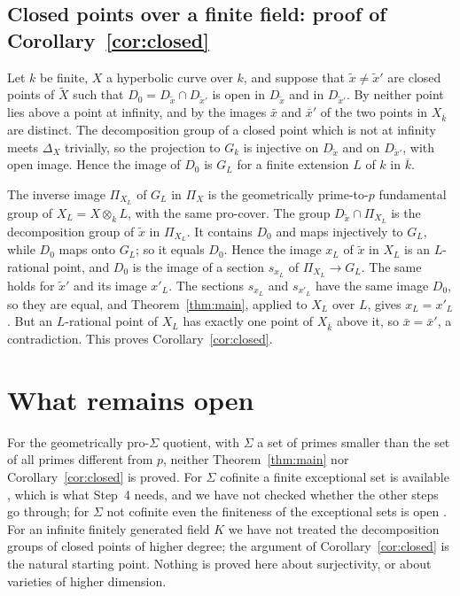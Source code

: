 \subsection{Closed points over a finite field: proof of Corollary~\ref{cor:closed}}
Let $k$ be finite, $X$ a hyperbolic curve over $k$, and suppose that $\tilde x\ne\tilde x'$ are closed points of $\widetilde X$ such that $D_0=D_{\tilde x}\cap D_{\tilde x'}$ is open in $D_{\tilde x}$ and in $D_{\tilde x'}$. By \cite[Proposition 1.8(ii)]{ST09} neither point lies above a point at infinity, and by \cite[Proposition 1.8(iii)]{ST09} the images $\bar x$ and $\bar x'$ of the two points in $X_{\overline k}$ are distinct. The decomposition group of a closed point which is not at infinity meets $\Delta_X$ trivially, so the projection to $G_k$ is injective on $D_{\tilde x}$ and on $D_{\tilde x'}$, with open image. Hence the image of $D_0$ is $G_L$ for a finite extension $L$ of $k$ in $\overline k$.

The inverse image $\Pi_{X_L}$ of $G_L$ in $\Pi_X$ is the geometrically prime-to-$p$ fundamental group of $X_L=X\otimes_kL$, with the same pro-cover. The group $D_{\tilde x}\cap\Pi_{X_L}$ is the decomposition group of $\tilde x$ in $\Pi_{X_L}$. It contains $D_0$ and maps injectively to $G_L$, while $D_0$ maps onto $G_L$; so it equals $D_0$. Hence the image $x_L$ of $\tilde x$ in $X_L$ is an $L$-rational point, and $D_0$ is the image of a section $s_{x_L}$ of $\Pi_{X_L}\to G_L$. The same holds for $\tilde x'$ and its image $x'_L$. The sections $s_{x_L}$ and $s_{x'_L}$ have the same image $D_0$, so they are equal, and Theorem~\ref{thm:main}, applied to $X_L$ over $L$, gives $x_L=x'_L$. But an $L$-rational point of $X_L$ has exactly one point of $X_{\overline k}$ above it, so $\bar x=\bar x'$, a contradiction. This proves Corollary~\ref{cor:closed}.

\section{What remains open}
For the geometrically pro-$\Sigma$ quotient, with $\Sigma$ a set of primes smaller than the set of all primes different from $p$, neither Theorem~\ref{thm:main} nor Corollary~\ref{cor:closed} is proved. For $\Sigma$ cofinite a finite exceptional set is available \cite[Proposition 1.8(vi)]{ST09}, which is what Step~4 needs, and we have not checked whether the other steps go through; for $\Sigma$ not cofinite even the finiteness of the exceptional sets is open \cite[Introduction, pp.~4--5]{ST18}. For an infinite finitely generated field $K$ we have not treated the decomposition groups of closed points of higher degree; the argument of Corollary~\ref{cor:closed} is the natural starting point. Nothing is proved here about surjectivity, or about varieties of higher dimension.

